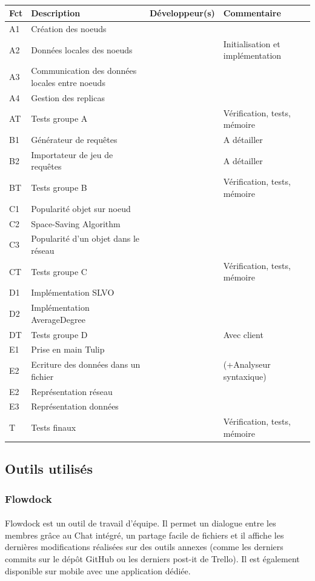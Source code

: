 \documentclass[12pt]{article}
\begin{document}
\paragraph{}
\begin{tabular}{| l | M{5cm} | M{3cm} | M{5.5cm} |}
    \hline
    Fct & Description & Développeur(s) & Commentaire \tabularnewline
    \hline
    A1 & Création des noeuds &  &   \tabularnewline
    \hline
    A2 & Données locales des noeuds &  & Initialisation et implémentation \tabularnewline
    \hline
    A3 & Communication des données locales entre noeuds &  &  \tabularnewline
    \hline
    A4 & Gestion des replicas &  &  \tabularnewline
    \hline
    AT & Tests groupe A &  &  Vérification, tests, mémoire \tabularnewline
    \hline 
    \hline
    B1 & Générateur de requêtes &  & A détailler  \tabularnewline
    \hline
    B2 & Importateur de jeu de requêtes &  & A détailler  \tabularnewline
    \hline
    BT & Tests groupe B &  &  Vérification, tests, mémoire \tabularnewline
    \hline
    \hline
    C1 & Popularité objet sur noeud &  &  \tabularnewline
    \hline
    C2 & Space-Saving Algorithm &  &  \tabularnewline
    \hline
    C3 & Popularité d'un objet dans le réseau &  &  \tabularnewline
    \hline
    CT & Tests groupe C &  & Vérification, tests, mémoire \tabularnewline
    \hline
    \hline
    D1 & Implémentation SLVO &  &  \tabularnewline
    \hline
    D2 & Implémentation AverageDegree &  &  \tabularnewline
    \hline
    DT & Tests groupe D &  &  Avec client \tabularnewline
    \hline
    \hline
    E1 & Prise en main Tulip &  &  \tabularnewline
    \hline
    E2 & Ecriture des données dans un fichier &  &  (+Analyseur syntaxique) \tabularnewline
    \hline
    E2 & Représentation réseau &  &  \tabularnewline
    \hline
    E3 & Représentation données &  &  \tabularnewline
    \hline
    \hline
    T & Tests finaux &  &  Vérification, tests, mémoire \tabularnewline
    \hline
\end{tabular}
 
\vspace{1cm}
 
\subsection{Outils utilisés}

\subsubsection{Flowdock}

\paragraph{}Flowdock est un outil de travail d'équipe. Il permet un dialogue entre les membres grâce au Chat intégré, un partage facile de fichiers et il affiche les dernières modifications réalisées sur des outils annexes (comme les derniers commits sur le dépôt GitHub ou les derniers post-it de Trello). Il est également disponible sur mobile avec une application dédiée.
\end{document}
